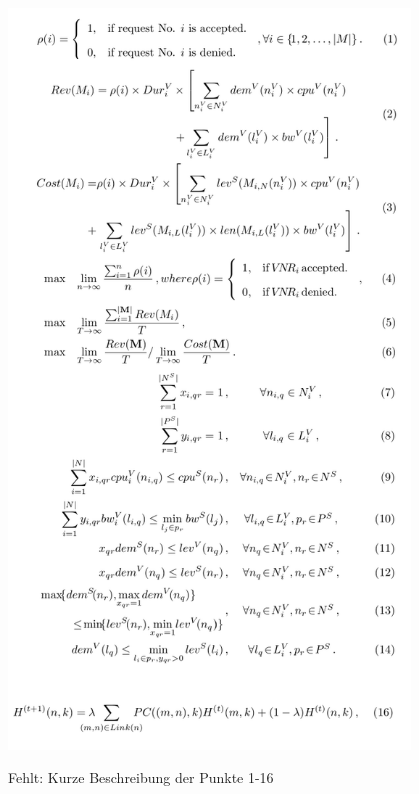 \documentclass{lni}
\begin{document}
\begin{center}
	\includegraphics[width=0.8\textwidth]{algo2.pdf}\newline
\end{center}

Fehlt: Kurze Beschreibung der Punkte 1-16
\end{document}
